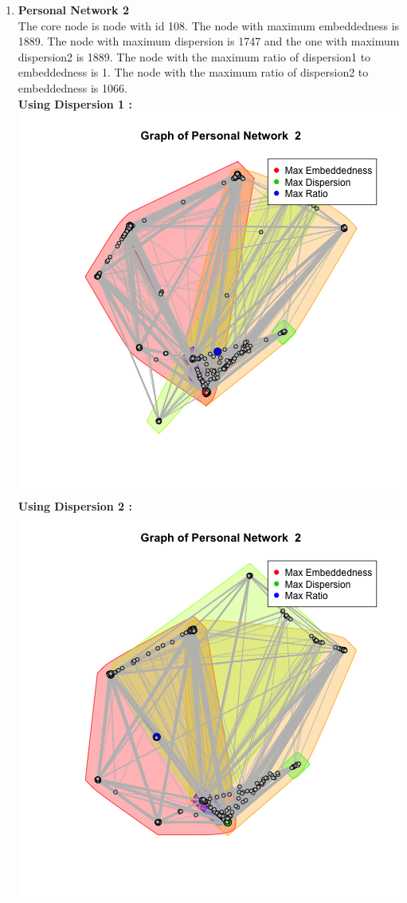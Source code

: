 \documentclass{article}
\begin{document}
\begin{enumerate}
 \item \textbf{Personal Network 2}\\
 The core node is node with id 108. The node with maximum embeddedness is 1889.
 The node with maximum dispersion is 1747 and the one with maximum dispersion2 is 1889.
 The node with the maximum ratio of dispersion1 to embeddedness is 1.
 The node with the maximum ratio of dispersion2 to embeddedness is 1066.\\
 \textbf{Using Dispersion 1 :}\\
 \includegraphics[scale=0.4]{d12} \\
 \textbf{Using Dispersion 2 :}\\
 \includegraphics[scale=0.4]{d15} \\
 

\end{enumerate}
\end{document}

